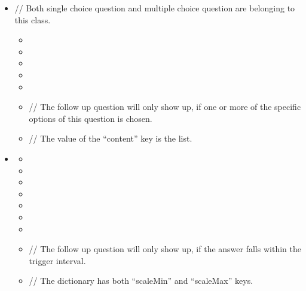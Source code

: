 \documentclass[a4paper]{scrreprt}
\begin{document}
\begin{itemize}
                    \item {}
                        \par // Both single choice question and multiple choice question are belonging to this class.
                        \begin{itemize}
                            \item {}
                            \item {}
                            \item {}
                            \item {}
                            \item {}
                            \item {}
                                \par // The follow up question will only show up, if one or more of the specific options of this question is chosen.
                            \item {}
                                \par // The value of the “content” key is the  list.
                        \end{itemize}

                    \item {}
                        \begin{itemize}
                            \item {}
                            \item {}
                            \item {}
                            \item {}
                            \item {}
                            \item {}
                            \item {}
                            \item {}
                                \par // The follow up question will only show up, if the answer falls within the trigger interval.
                            \item {}
                               \par // The dictionary has both “scaleMin” and “scaleMax” keys.
                        \end{itemize}
                        

\end{itemize}
\end{document}

